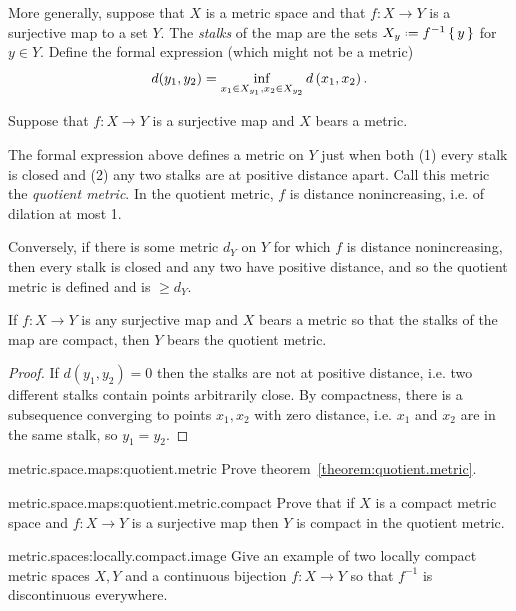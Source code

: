 More generally, suppose that \(X\) is a metric space and that \(f \colon X \to Y\) is a surjective map to a set \(Y\).
The \emph{stalks} of the map are the sets \(X_y\defeq f^{-1}\set{y}\) for \(y \in Y\).
Define the formal expression (which might not be a metric)
\[
d(y_1,y_2)=\inf_{x_1 \in X_{y_1}, x_2 \in X_{y_2}} d\left(x_1,x_2\right).
\]
\begin{theorem}\label{theorem:quotient.metric}
Suppose that \(f \colon X \to Y\) is a surjective map and \(X\) bears a metric.

The formal expression above defines a metric on \(Y\) just when both (1) every stalk is closed and (2) any two stalks are at positive distance apart.
Call this metric the \emph{quotient metric}.
In the quotient metric, \(f\) is distance nonincreasing, i.e. of dilation at most 1.

Conversely, if there is some metric \(d_Y\) on \(Y\) for which \(f\) is distance nonincreasing, then every stalk is closed and any two have positive distance, and so the quotient metric is defined and is \(\ge d_Y\).
\end{theorem}
\begin{corollary}
If \(f \colon X \to Y\) is any surjective map and \(X\) bears a metric so that the stalks of the map are compact, then \(Y\) bears the quotient metric.
\end{corollary}
\begin{proof}
If \(d(y_1,y_2)=0\) then the stalks are not at positive distance, i.e. two different stalks contain points arbitrarily close.
By compactness, there is a subsequence converging to points \(x_1, x_2\) with zero distance, i.e. \(x_1\) and \(x_2\) are in the same stalk, so \(y_1=y_2\).
\end{proof}
\begin{problem}{metric.space.maps:quotient.metric}
Prove theorem~\vref{theorem:quotient.metric}.
\end{problem}
\begin{problem}{metric.space.maps:quotient.metric.compact}
Prove that if \(X\) is a compact metric space and \(f \colon X \to Y\) is a surjective map then \(Y\) is compact in the quotient metric.
\end{problem}
\begin{problem}{metric.spaces:locally.compact.image}
Give an example of two locally compact metric spaces \(X,Y\) and a continuous bijection \(f \colon X \to Y\) so that \(f^{-1}\) is discontinuous everywhere.
\end{problem}
